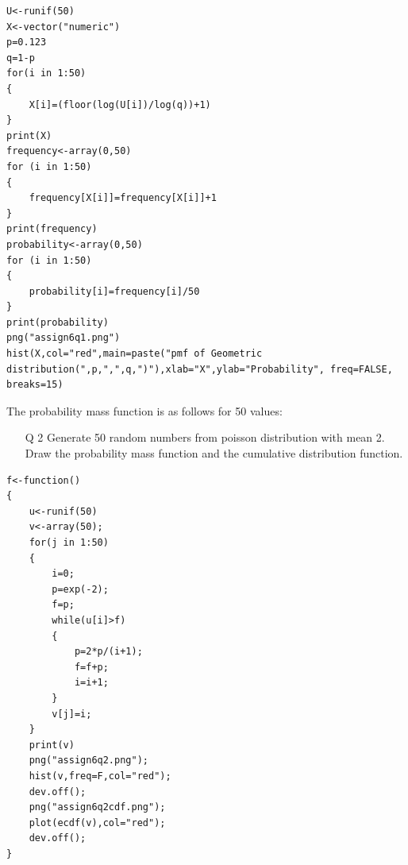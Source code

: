 \documentclass[12pt]{book}
\begin{document}
\begin{lstlisting}
U<-runif(50)
X<-vector("numeric")
p=0.123
q=1-p
for(i in 1:50)
{
	X[i]=(floor(log(U[i])/log(q))+1)
}
print(X)
frequency<-array(0,50)
for (i in 1:50) 
{
	frequency[X[i]]=frequency[X[i]]+1
}
print(frequency)
probability<-array(0,50)
for (i in 1:50)
{
	probability[i]=frequency[i]/50
}
print(probability)
png("assign6q1.png")
hist(X,col="red",main=paste("pmf of Geometric distribution(",p,",",q,")"),xlab="X",ylab="Probability", freq=FALSE, breaks=15)
\end{lstlisting}
\newpage
The probability mass function is as follows for 50 values:
\begin{figure}[H]
	\centering
\end{figure}
\newpage
\begin{enumerate}
\item[Q 2] Generate 50 random numbers from poisson distribution with mean 2. Draw the probability mass function and the cumulative distribution function.
\end{enumerate}
\begin{lstlisting}
f<-function()
{
	u<-runif(50)
	v<-array(50);
	for(j in 1:50)
	{
		i=0;
		p=exp(-2);
		f=p;
		while(u[i]>f)
		{
			p=2*p/(i+1);
			f=f+p;
			i=i+1;
		}
		v[j]=i;
	}
	print(v)
	png("assign6q2.png");
	hist(v,freq=F,col="red");
	dev.off();
	png("assign6q2cdf.png");
	plot(ecdf(v),col="red");
	dev.off();
}
\end{lstlisting}
\end{document}
